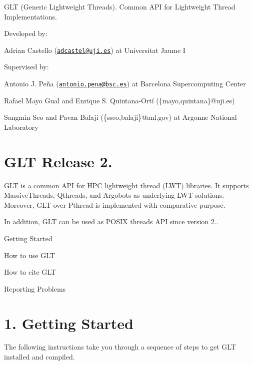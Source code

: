 G\-L\-T (Generic Lightweight Threads). Common A\-P\-I for Lightweight Thread Implementations.


\begin{DoxyItemize}
\item Developed by\-:
\begin{DoxyItemize}
\item Adrian Castello (\href{mailto:adcastel@uji.es}{\tt adcastel@uji.\-es}) at Universitat Jaume I
\end{DoxyItemize}
\item Supervised by\-:
\begin{DoxyItemize}
\item Antonio J. Peña (\href{mailto:antonio.pena@bsc.es}{\tt antonio.\-pena@bsc.\-es}) at Barcelona Supercomputing Center
\item Rafael Mayo Gual and Enrique S. Quintana-\/\-Ortí (\{mayo,quintana\}@uji.\-es)
\item Sangmin Seo and Pavan Balaji (\{sseo,balaji\}@anl.\-gov) at Argonne National Laboratory 


\end{DoxyItemize}
\end{DoxyItemize}

\section*{G\-L\-T Release 2. }

G\-L\-T is a common A\-P\-I for H\-P\-C lightweight thread (L\-W\-T) libraries. It supports Massive\-Threads, Qthreads, and Argobots as underlying L\-W\-T solutions. Moreover, G\-L\-T over Pthread is implemented with comparative purpose.

In addition, G\-L\-T can be used as P\-O\-S\-I\-X threads A\-P\-I since version 2..


\begin{DoxyEnumerate}
\item Getting Started
\item How to use G\-L\-T
\item How to cite G\-L\-T
\item Reporting Problems 


\end{DoxyEnumerate}

\section*{1. Getting Started }

The following instructions take you through a sequence of steps to get G\-L\-T installed and compiled.

